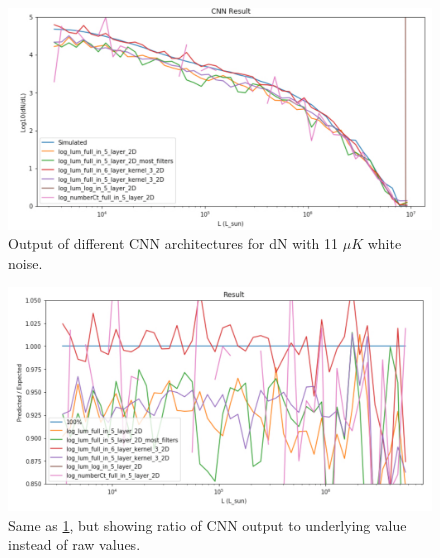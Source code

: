 \documentclass{article}
\begin{document}
			\begin{figure}[H]
				\centering
				\includegraphics[width=1.0\textwidth]{arch_compare_noise_dn.pdf}
				\caption{Output of different CNN architectures for dN with 11 \(\mu K\) white noise.}
				\label{fig:arch_compare_noise_dn}
			\end{figure}

			\begin{figure}[H]
				\centering
				\includegraphics[width=1.0\textwidth]{arch_compare_noise_dn_ratio.pdf}
				\caption{Same as \cref{fig:arch_compare_noise_dn}, but showing ratio of CNN output to underlying value instead of raw values.}
				\label{fig:arch_compare_noise_dn_ratio}
			\end{figure}
\end{document}
